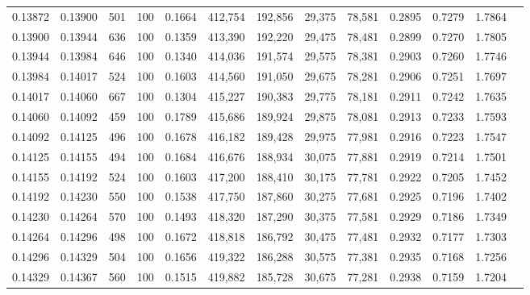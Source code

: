 \begin{tabular}{rrrrrrrrrrrrr}
0.13872 & 0.13900 &   501 & 100 &                                     0.1664 & 412,754 & 192,856 &  29,375 &  78,581 & 0.2895 & 0.7279 & 1.7864 \\
0.13900 & 0.13944 &   636 & 100 &                                     0.1359 & 413,390 & 192,220 &  29,475 &  78,481 & 0.2899 & 0.7270 & 1.7805 \\
0.13944 & 0.13984 &   646 & 100 &                                     0.1340 & 414,036 & 191,574 &  29,575 &  78,381 & 0.2903 & 0.7260 & 1.7746 \\
0.13984 & 0.14017 &   524 & 100 &                                     0.1603 & 414,560 & 191,050 &  29,675 &  78,281 & 0.2906 & 0.7251 & 1.7697 \\
0.14017 & 0.14060 &   667 & 100 &                                     0.1304 & 415,227 & 190,383 &  29,775 &  78,181 & 0.2911 & 0.7242 & 1.7635 \\
0.14060 & 0.14092 &   459 & 100 &                                     0.1789 & 415,686 & 189,924 &  29,875 &  78,081 & 0.2913 & 0.7233 & 1.7593 \\
0.14092 & 0.14125 &   496 & 100 &                                     0.1678 & 416,182 & 189,428 &  29,975 &  77,981 & 0.2916 & 0.7223 & 1.7547 \\
0.14125 & 0.14155 &   494 & 100 &                                     0.1684 & 416,676 & 188,934 &  30,075 &  77,881 & 0.2919 & 0.7214 & 1.7501 \\
0.14155 & 0.14192 &   524 & 100 &                                     0.1603 & 417,200 & 188,410 &  30,175 &  77,781 & 0.2922 & 0.7205 & 1.7452 \\
0.14192 & 0.14230 &   550 & 100 &                                     0.1538 & 417,750 & 187,860 &  30,275 &  77,681 & 0.2925 & 0.7196 & 1.7402 \\
0.14230 & 0.14264 &   570 & 100 &                                     0.1493 & 418,320 & 187,290 &  30,375 &  77,581 & 0.2929 & 0.7186 & 1.7349 \\
0.14264 & 0.14296 &   498 & 100 &                                     0.1672 & 418,818 & 186,792 &  30,475 &  77,481 & 0.2932 & 0.7177 & 1.7303 \\
0.14296 & 0.14329 &   504 & 100 &                                     0.1656 & 419,322 & 186,288 &  30,575 &  77,381 & 0.2935 & 0.7168 & 1.7256 \\
0.14329 & 0.14367 &   560 & 100 &                                     0.1515 & 419,882 & 185,728 &  30,675 &  77,281 & 0.2938 & 0.7159 & 1.7204 \\

\end{tabular}
